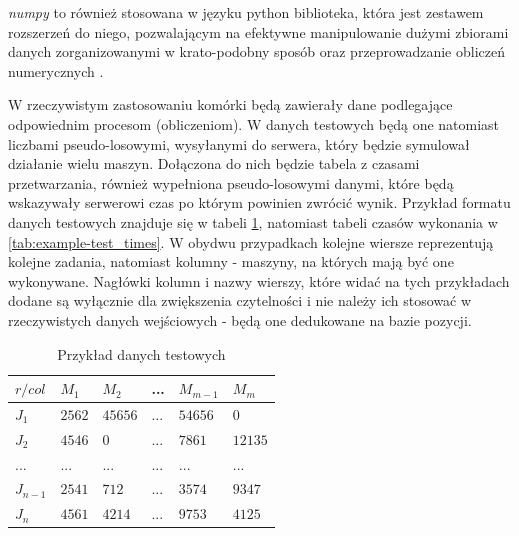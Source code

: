 \documentclass[brudnopis]{xmgr}
\begin{document}
\emph{numpy} to również stosowana w języku python biblioteka, która jest zestawem rozszerzeń do niego, pozwalającym na efektywne manipulowanie dużymi zbiorami danych zorganizowanymi w krato-podobny sposób oraz przeprowadzanie obliczeń numerycznych \cite{NUMPY1:2020:X} \cite{NUMPY2:1999:X}.
\medskip

W rzeczywistym zastosowaniu komórki będą zawierały dane podlegające odpowiednim procesom (obliczeniom).
W danych testowych będą one natomiast liczbami pseudo-losowymi, wysyłanymi do serwera, który będzie symulował działanie wielu maszyn. Dołączona do nich będzie tabela z czasami przetwarzania, również wypełniona pseudo-losowymi danymi, które będą wskazywały serwerowi czas po którym powinien zwrócić wynik.
Przykład formatu danych testowych znajduje się w tabeli \ref{tab:example-test_data}, natomiast tabeli czasów wykonania w \ref{tab:example-test_times}. W obydwu przypadkach kolejne wiersze reprezentują kolejne zadania, natomiast kolumny - maszyny, na których mają być one wykonywane. Nagłówki kolumn i nazwy wierszy, które widać na tych przykładach dodane są wyłącznie dla zwiększenia czytelności i nie należy ich stosować w rzeczywistych danych wejściowych - będą one dedukowane na bazie pozycji.
\medskip

\begin{table}[!tbh]
\begin{tabular}{|l|l|l|l|l|l|} \hline
$r / col$   & $M_1$     & $M_2$     & ...   & $M_{m-1}$ & $M_{m}$   \\ \hline
$J_1$       & $2562$    & $45656$   & ...   & $54656$   & $0$       \\ \hline
$J_2$       & $4546$    & $0$       & ...   & $7861$    & $12135$   \\ \hline
$...$       & $...$     & $...$     & $...$ & $...$     & $...$     \\ \hline
$J_{n-1}$   & $2541$    & $712$     & ...   & $3574$    & $9347$    \\ \hline
$J_{n}$     & $4561$    & $4214$    & ...   & $9753$    & $4125$    \\ \hline
\end{tabular}
\caption{Przykład danych testowych\label{tab:example-test_data}}
\end{table}
\end{document}
